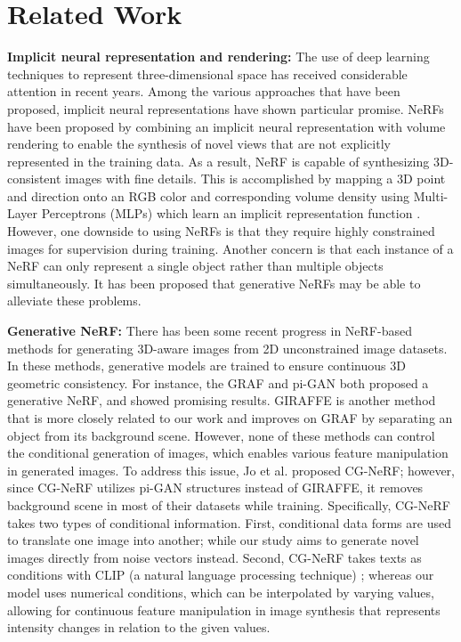 \documentclass[nohyperref]{article}
\theoremstyle{plain}
\theoremstyle{definition}
\theoremstyle{remark}
\begin{document}
\section{Related Work}
\label{related_work}
\textbf{Implicit neural representation and rendering:} The use of deep learning techniques \cite{lecun2015deep} to represent three-dimensional space has received considerable attention in recent years. Among the various approaches that have been proposed, implicit neural representations \cite{sitzmann2019scene, tulsiani2020implicit, rajeswar2020pix2shape} have shown particular promise. NeRFs have been proposed by combining an implicit neural representation with volume rendering \cite{drebin1988volume} to enable the synthesis of novel views that are not explicitly represented in the training data. As a result, NeRF is capable of synthesizing 3D-consistent images with fine details. This is accomplished by mapping a 3D point and direction onto an RGB color and corresponding volume density using Multi-Layer Perceptrons (MLPs) \cite{pinkus1999approximation} which learn an implicit representation function \cite{mescheder2019occupancy, chabra2020deep, yariv2020multiview}. However, one downside to using NeRFs is that they require highly constrained images for supervision during training. Another concern is that each instance of a NeRF can only represent a single object rather than multiple objects simultaneously. It has been proposed that generative NeRFs may be able to alleviate these problems.

\textbf{Generative NeRF:} There has been some recent progress in NeRF-based methods for generating 3D-aware images from 2D unconstrained image datasets. In these methods, generative models are trained to ensure continuous 3D geometric consistency. For instance, the GRAF \cite{schwarz2020graf} and pi-GAN \cite{chan2021pi} both proposed a generative NeRF, and showed promising results. GIRAFFE is another method that is more closely related to our work and improves on GRAF by separating an object from its background scene. However, none of these methods can control the conditional generation of images, which enables various feature manipulation in generated images. To address this issue, Jo et al. proposed CG-NeRF; however, since CG-NeRF utilizes pi-GAN structures instead of GIRAFFE, it removes background scene in most of their datasets while training. Specifically, CG-NeRF takes two types of conditional information. First, conditional data forms are used to translate one image into another; while our study aims to generate novel images directly from noise vectors instead. Second, CG-NeRF takes texts as conditions with CLIP (a natural language processing technique) \cite{radford2021learning}; whereas our model uses numerical conditions, which can be interpolated by varying values, allowing for continuous feature manipulation in image synthesis that represents intensity changes in relation to the given values.
\end{document}

